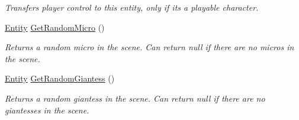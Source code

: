 \begin{DoxyCompactItemize}
\begin{DoxyCompactList}\small\item\em Transfers player control to this entity, only if it\textquotesingle{}s a playable character. \end{DoxyCompactList}\item 
\mbox{\hyperlink{class_lua_1_1_entity}{Entity}} \mbox{\hyperlink{class_lua_1_1_entity_aad0651348795eb39acee39055e0b7638}{Get\+Random\+Micro}} ()
\begin{DoxyCompactList}\small\item\em Returns a random micro in the scene. Can return null if there are no micros in the scene. \end{DoxyCompactList}\item 
\mbox{\hyperlink{class_lua_1_1_entity}{Entity}} \mbox{\hyperlink{class_lua_1_1_entity_aa9df9f39762cb24b89449e8b61aab43c}{Get\+Random\+Giantess}} ()
\begin{DoxyCompactList}\small\item\em Returns a random giantess in the scene. Can return null if there are no giantesses in the scene. \end{DoxyCompactList}\end{DoxyCompactItemize}
